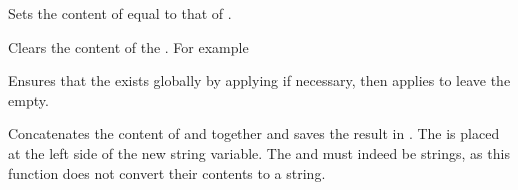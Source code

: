 \documentclass[oneside]{book}
\begin{document}
\begin{function}{\strSetEq}
\begin{syntax}
  
\end{syntax}
Sets the content of  equal to that of .
\begin{demohigh}
\strSet {}
\strSetEq \lTmpbStr \lTmpaStr
\strUse \lTmpbStr
\end{demohigh}
\end{function}

\begin{function}{\strClear}
\begin{syntax}
 
\end{syntax}
Clears the content of the . For example
\begin{demohigh}
\strSet {}
\strClear \lTmpjStr
\strSet {}
\strUse \lTmpjStr
\end{demohigh}
\end{function}

\begin{function}{\strClearNew}
\begin{syntax}
 
\end{syntax}
Ensures that the  exists globally by applying
 if necessary, then applies  to leave
the  empty.
\begin{codehigh}
\strClearNew \lFooSomeStr
\strUse \lFooSomeStr
\end{codehigh}
\end{function}

\begin{function}{\strConcat}
\begin{syntax}
   
\end{syntax}
Concatenates the content of  and 
together and saves the result in . The 
is placed at the left side of the new string variable.
The  and  must indeed be strings, as
this function does not convert their contents to a string.
\begin{demohigh}
\strSet {}
\strSet {}
\strConcat \lTmpaStr \lTmpbStr \lTmpcStr
\strUse \lTmpaStr
\end{demohigh}
\end{function}
\end{document}
